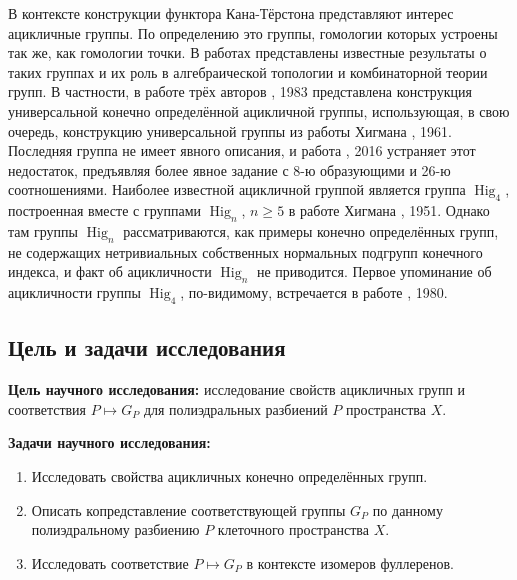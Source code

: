 \documentclass[14pt, dvipsnames, twoside]{extarticle}
\theoremstyle{definition}
\theoremstyle{remark}
\DeclareMathOperator{\Hig}{\mathrm{Hig}}
\begin{document}
В контексте конструкции функтора Кана-Тёрстона представляют интерес ацикличные группы. По определению это группы, гомологии которых устроены так же, как гомологии точки. В работах \cite{View, BerrickHillman, BDH, BaumslagUniversal} представлены известные результаты о таких группах и их роль в алгебраической топологии и комбинаторной теории групп. В частности, в работе трёх авторов \cite{BaumslagUniversal}, 1983 представлена конструкция универсальной конечно определённой ацикличной группы, использующая, в свою очередь, конструкцию универсальной  группы из работы Хигмана \cite{UniversalHigmanGroup}, 1961. Последняя группа не имеет явного описания, и работа \cite{ExplicityPresentation}, 2016 устраняет этот недостаток, предъявляя более явное задание с 8-ю образующими и 26-ю соотношениями. Наиболее известной ацикличной группой является группа $\Hig_4$, построенная вместе с группами $\Hig_n$, $n\geqslant 5$ в работе Хигмана \cite{Higman}, 1951. Однако там группы $\Hig_n$ рассматриваются, как примеры конечно определённых групп, не содержащих нетривиальных собственных нормальных подгрупп конечного индекса, и факт об ацикличности $\Hig_n$ не приводится. Первое упоминание об ацикличности группы $\Hig_4$, по-видимому, встречается в работе \cite{BDH}, 1980.   










\subsection{Цель и задачи исследования}



 

{\bf Цель научного исследования:} исследование свойств ацикличных групп и соответствия $P\mapsto G_P$ для  полиэдральных разбиений $P$ пространства $X$.

{\bf Задачи научного исследования:}

\begin{enumerate}[\bf 1.]

\item Исследовать свойства ацикличных конечно определённых групп.

\item Описать копредставление соответствующей группы $G_P$ по данному полиэдральному разбиению $P$ клеточного пространства $X$. 

\item Исследовать соответствие $P\mapsto G_P$ в контексте изомеров фуллеренов.

\end{enumerate}
\end{document}
